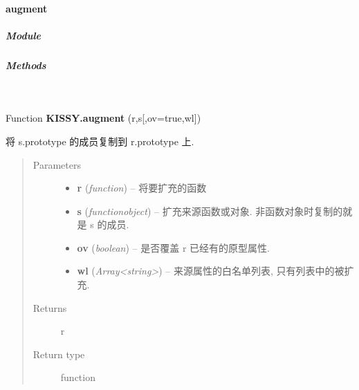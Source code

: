 \documentclass[letterpaper,10pt,english]{sphinxmanual}
\begin{document}
\paragraph{augment}
\label{api/seed/kissy/augment::doc}\label{api/seed/kissy/augment:augment}

\subparagraph{Module}
\label{api/seed/kissy/augment:module}\begin{quote}

{\hyperref[api/seed/kissy/index:module-Seed]{}}
\end{quote}


\subparagraph{Methods}
\label{api/seed/kissy/augment:methods}

\begin{fulllineitems}
\label{api/seed/kissy/augment:Seed.KISSY.augment}~
\begin{DUlineblock}{0em}
\item[] Function \textbf{KISSY.augment} (r,s{[},ov=true,wl{]})
\item[] 将 s.prototype 的成员复制到 r.prototype 上.
\end{DUlineblock}
\begin{quote}\begin{description}
\item[{Parameters}] \leavevmode\begin{itemize}
\item {}
\textbf{r} (\emph{function}) -- 将要扩充的函数

\item {}
\textbf{s} (\emph{function\textbar{}object}) -- 扩充来源函数或对象. 非函数对象时复制的就是 s 的成员.

\item {}
\textbf{ov} (\emph{boolean}) -- 是否覆盖 r 已经有的原型属性.

\item {}
\textbf{wl} (\emph{Array\textless{}string\textgreater{}}) -- 来源属性的白名单列表, 只有列表中的被扩充.

\end{itemize}

\item[{Returns}] \leavevmode
r

\item[{Return type}] \leavevmode
function

\end{description}\end{quote}


\end{fulllineitems}
\end{document}
